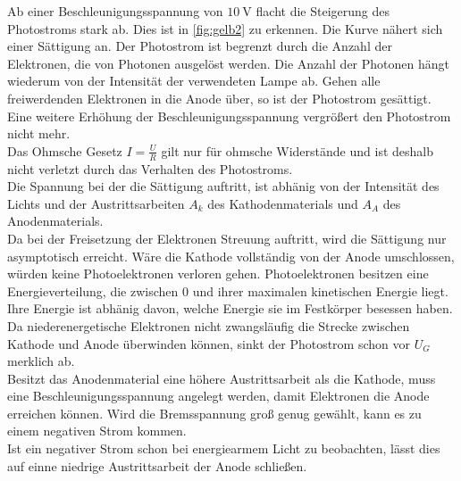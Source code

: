 Ab einer Beschleunigungsspannung von $\SI{10}{\volt}$ flacht die Steigerung des Photostroms stark ab.
Dies ist in \autoref{fig:gelb2} zu erkennen. Die Kurve nähert sich einer Sättigung an.
Der Photostrom ist begrenzt durch die Anzahl der Elektronen, die von Photonen ausgelöst werden.
Die Anzahl der Photonen hängt wiederum von der Intensität der verwendeten Lampe ab.
Gehen alle freiwerdenden Elektronen in die Anode über, so ist der Photostrom gesättigt.
Eine weitere Erhöhung der Beschleunigungsspannung vergrößert den Photostrom nicht mehr.
\\
Das Ohmsche Gesetz $I = \frac{U}{R}$ gilt nur für ohmsche Widerstände und ist deshalb nicht verletzt durch das Verhalten des Photostroms.
\\
Die Spannung bei der die Sättigung auftritt, ist abhänig von der Intensität des Lichts und der Austrittsarbeiten $A_k$ des Kathodenmaterials
und $A_A$ des Anodenmaterials.\\
Da bei der Freisetzung der Elektronen Streuung auftritt, wird die Sättigung nur asymptotisch erreicht.
Wäre die Kathode vollständig von der Anode umschlossen, würden keine Photoelektronen verloren gehen.
Photoelektronen besitzen eine Energieverteilung, die zwischen $0$ und ihrer maximalen kinetischen Energie liegt.
Ihre Energie ist abhänig davon, welche Energie sie im Festkörper besessen haben.
Da niederenergetische Elektronen nicht zwangsläufig die Strecke zwischen Kathode und Anode überwinden können,
sinkt der Photostrom schon vor $U_G$ merklich ab.\\
Besitzt das Anodenmaterial eine höhere Austrittsarbeit als die Kathode,
muss eine Beschleunigungsspannung angelegt werden, damit Elektronen die Anode erreichen können.
Wird die Bremsspannung groß genug gewählt, kann es zu einem negativen Strom kommen.\\
Ist ein negativer Strom schon bei energiearmem Licht zu beobachten, lässt dies auf einne niedrige Austrittsarbeit der Anode schließen.\\
